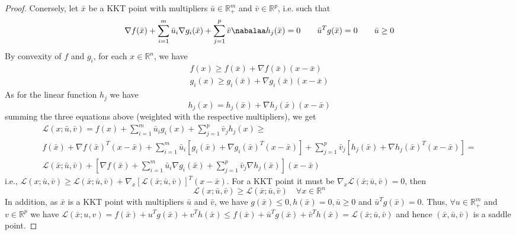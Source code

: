 \documentclass{book}
\newcommand{\R}{\mathbb{R}}
\theoremstyle{theoremv2}
\theoremstyle{defv2}
\theoremstyle{remark}
\theoremstyle{remark}
\begin{document}
\begin{proof}
    Conersely, let $\bar{x}$ be a KKT point with multipliers $\bar{u}\in\R^m_+$ and $\bar{v}\in\R^p$, i.e. such that 
    \[
        \nabla f(\bar{x})+ \displaystyle\sum_{i=1}^{m}\bar{u}_i\nabla g_i(\bar{x}) + \displaystyle\sum_{j=1}^{p}\bar{v}\nabalaa h_j(\bar{x})=0 \qquad \bar{u}^Tg(\bar{x})=0 \qquad \bar{u}\geq0
    \]
    By convexity of $f$ and $g_i$, for each $x\in \R^n$, we have 
    \begin{align*}
        f(x)\geq f(\bar{x})+\nabla f(\bar{x})(x-\bar{x})\\
        g_i(x)\geq g_i(\bar{x})+\nabla g_i(\bar{x})(x-\bar{x})
    \end{align*}
    As for the linear function $h_j$ we have
    \[
        h_j(x)=h_j(\bar{x})+\nabla h_j(\bar{x}) (x-\bar{x})
    \]
    summing the three equations above (weighted with the respective multipliers), we get
    \begin{gather*}
        \mathcal{L}(x;\bar{u},\bar{v}) = f(x) + \displaystyle\sum_{i=1}^{m}\bar{u}_ig_i(x) + \displaystyle\sum_{j=1}^{p}\bar{v}_jh_j(x)\geq \\
        f(\bar{x}) + \nabla f(\bar{x})^T(x-\bar{x}) + \displaystyle\sum_{i=1}^{m}\bar{u}_i[g_i(\bar{x})+\nabla g_i(\bar{x})^T(x-\bar{x})]+\displaystyle\sum_{j=1}^{p}\bar{v}_j[h_j(\bar{x})+\nabla h_j(\bar{x})^T(x-\bar{x})] = \\
        \mathcal{L}(\bar{x};\bar{u},\bar{v}) + [\nabla f(\bar{x})+\displaystyle\sum_{i=1}^{m}\bar{u}_i\nabla g_i(\bar{x})+ \displaystyle\sum_{j=1}^{p}\bar{v}_j\nabla h_j(\bar{x})](x-\bar{x})
    \end{gather*}
    i.e., $\mathcal{L}(x;\bar{u},\bar{v})\geq\mathcal{L}(\bar{x};\bar{u},\bar{v})+\nabla_x [\mathcal{L}(\bar{x};\bar{u},\bar{v})]^T(x-\bar{x})$. For a KKT point it must be $\nabla_x\mathcal{L}(\bar{x};\bar{u},\bar{v})=0$, then 
    \[
        \mathcal{L}(x;\bar{u},\bar{v})\geq \mathcal{L}(\bar{x};\bar{u},\bar{v}) \quad \forall x\in\R^n
    \]
    In addition, as $\bar{x}$ is a KKT point with multipliers $\bar{u}$ and $\bar{v}$, we have $g(\bar{x})\leq0,h(\bar{x})=0,\bar{u}\geq0$ and $\bar{u}^Tg(\bar{x})=0$. Thus, $\forall u\in\R^m_+$ and $v\in\R^p$ we have $\mathcal{L}(\bar{x};u,v)= f(\bar{x}) + u^Tg(\bar{x}) + v^Th(\bar{x})\leq f(\bar{x}) + \bar{u}^Tg(\bar{x}) + \bar{v}^Th(\bar{x})=\mathcal{L}(\bar{x};\bar{u},\bar{v})$ and hence $(\bar{x},\bar{u},\bar{v})$ is a saddle point.
\end{proof}
\end{document}
